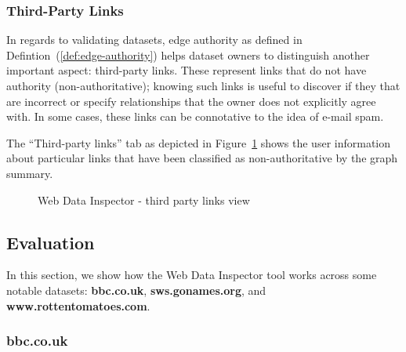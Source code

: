 \subsubsection{Third-Party Links}

In regards to validating datasets, edge authority as defined in Defintion~(\ref{def:edge-authority}) helps dataset owners to distinguish another important aspect: third-party links. These represent links that do not have authority (non-authoritative); knowing such links is useful to discover if they that are incorrect or specify relationships that the owner does not explicitly agree with. In some cases, these links can be connotative to the idea of e-mail spam.

The ``Third-party links'' tab as depicted in Figure~\ref{fig:wdi:thirdPartyLinks} shows the user information about particular links that have been classified as non-authoritative by the graph summary.

\begin{figure}
	\centering
	\caption{Web Data Inspector - third party links view}
	\label{fig:wdi:thirdPartyLinks}
\end{figure}

\subsection{Evaluation}

In this section, we show how the Web Data Inspector tool works across some notable datasets: \textbf{bbc.co.uk}, \textbf{sws.gonames.org}, and \textbf{www.rottentomatoes.com}.

\subsubsection{bbc.co.uk}

